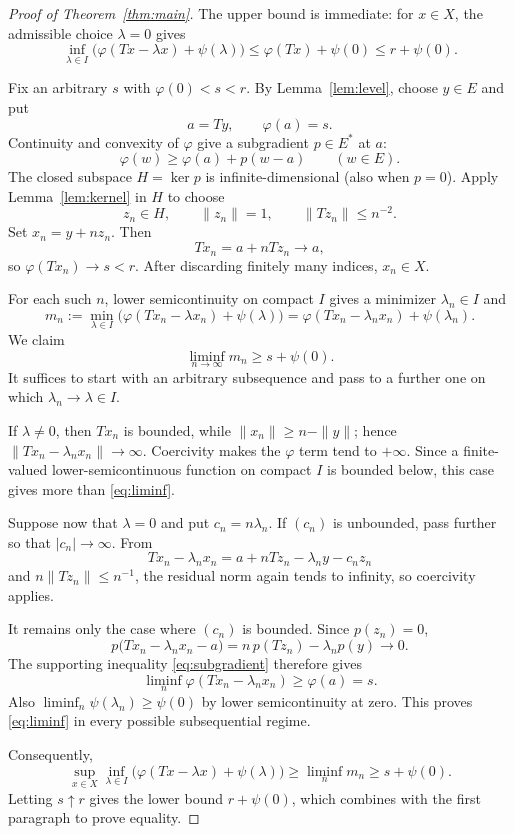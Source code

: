 \documentclass[11pt]{article}
\begin{document}
\begin{proof}[Proof of Theorem~\ref{thm:main}]
The upper bound is immediate: for $x\in X$, the admissible choice $\lambda=0$
gives
\[
 \inf_{\lambda\in I}\bigl(\varphi(Tx-\lambda x)+\psi(\lambda)\bigr)
 \le \varphi(Tx)+\psi(0)\le r+\psi(0).
\]

Fix an arbitrary $s$ with $\varphi(0)<s<r$.  By Lemma~\ref{lem:level}, choose
$y\in E$ and put
\[
 a=Ty,\qquad \varphi(a)=s.
\]
Continuity and convexity of $\varphi$ give a subgradient $p\in E^*$ at $a$:
\begin{equation}\label{eq:subgradient}
 \varphi(w)\ge \varphi(a)+p(w-a)\qquad(w\in E).
\end{equation}
The closed subspace $H=\ker p$ is infinite-dimensional (also when $p=0$).
Apply Lemma~\ref{lem:kernel} in $H$ to choose
\[
 z_n\in H,\qquad \|z_n\|=1,\qquad \|Tz_n\|\le n^{-2}.
\]
Set $x_n=y+nz_n$.  Then
\[
 Tx_n=a+nTz_n\longrightarrow a,
\]
so $\varphi(Tx_n)\to s<r$.  After discarding finitely many indices,
$x_n\in X$.

For each such $n$, lower semicontinuity on compact $I$ gives a minimizer
$\lambda_n\in I$ and
\[
 m_n:=\min_{\lambda\in I}
 \bigl(\varphi(Tx_n-\lambda x_n)+\psi(\lambda)\bigr)
 =\varphi(Tx_n-\lambda_nx_n)+\psi(\lambda_n).
\]
We claim
\begin{equation}\label{eq:liminf}
 \liminf_{n\to\infty}m_n\ge s+\psi(0).
\end{equation}
It suffices to start with an arbitrary subsequence and pass to a further one
on which $\lambda_n\to\lambda\in I$.

If $\lambda\ne0$, then $Tx_n$ is bounded, while
$\|x_n\|\ge n-\|y\|$; hence
$\|Tx_n-\lambda_nx_n\|\to\infty$.  Coercivity makes the $\varphi$ term tend
to $+\infty$.  Since a finite-valued lower-semicontinuous function on compact
$I$ is bounded below, this case gives more than \eqref{eq:liminf}.

Suppose now that $\lambda=0$ and put $c_n=n\lambda_n$.  If $(c_n)$ is
unbounded, pass further so that $|c_n|\to\infty$.  From
\[
 Tx_n-\lambda_nx_n
 =a+nTz_n-\lambda_ny-c_nz_n
\]
and $n\|Tz_n\|\le n^{-1}$, the residual norm again tends to infinity, so
coercivity applies.

It remains only the case where $(c_n)$ is bounded.  Since $p(z_n)=0$,
\[
 p\bigl(Tx_n-\lambda_nx_n-a\bigr)
 =n\,p(Tz_n)-\lambda_n p(y)\longrightarrow0.
\]
The supporting inequality \eqref{eq:subgradient} therefore gives
\[
 \liminf_n\varphi(Tx_n-\lambda_nx_n)\ge\varphi(a)=s.
\]
Also $\liminf_n\psi(\lambda_n)\ge\psi(0)$ by lower semicontinuity at zero.
This proves \eqref{eq:liminf} in every possible subsequential regime.

Consequently,
\[
 \sup_{x\in X}\inf_{\lambda\in I}
 \bigl(\varphi(Tx-\lambda x)+\psi(\lambda)\bigr)
 \ge \liminf_n m_n\ge s+\psi(0).
\]
Letting $s\uparrow r$ gives the lower bound $r+\psi(0)$, which combines with
the first paragraph to prove equality.
\end{proof}
\end{document}
